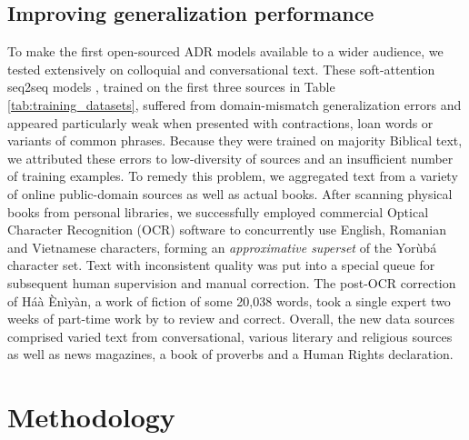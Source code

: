 \documentclass{article} %
\begin{document}

\subsection{Improving generalization performance}

To make the first open-sourced ADR models available to a wider audience, we tested extensively on colloquial and conversational text. These soft-attention seq2seq models \citep{orife2018adr}, trained on the first three sources in Table \ref{tab:training_datasets}, suffered from domain-mismatch generalization errors and appeared particularly weak when presented with contractions, loan words or variants of common phrases. Because they were trained on majority Biblical text, we attributed these errors to low-diversity of sources and an insufficient number of training examples. To remedy this problem, we aggregated text from a variety of online public-domain sources as well as actual books. After scanning physical books from personal libraries, we successfully employed commercial Optical Character Recognition (OCR) software to concurrently use English, Romanian and Vietnamese characters, forming an \emph{approximative superset} of the Yor{\`u}b{\'a} character set. Text with inconsistent quality was put into a special queue for subsequent human supervision and manual correction. The post-OCR correction of H{\'a}{\`a} {\`E}n{\`i}y{\`a}n, a work of fiction of some 20,038 words, took a single expert two weeks of part-time work by to review and correct. Overall, the new data sources comprised varied text from conversational, various literary and religious sources as well as news magazines, a book of proverbs and a Human Rights declaration.

\section{Methodology}\label{sec:methods}

\end{document}
